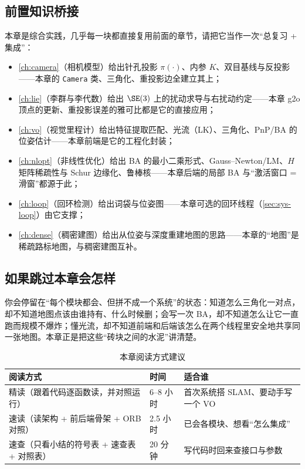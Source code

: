 \subsection*{前置知识桥接}
本章是综合实践，几乎每一块都直接复用前面的章节，请把它当作一次“总复习 + 集成”：
\begin{itemize}
  \item \cref{ch:camera}（相机模型）给出针孔投影 $\pi(\cdot)$、内参 $K$、双目基线与反投影——本章的 \texttt{Camera} 类、三角化、重投影边全建立其上；
  \item \cref{ch:lie}（李群与李代数）给出 $\SE(3)$ 上的扰动求导与右扰动约定——本章 g2o 顶点的更新、重投影误差的雅可比都是它的直接应用；
  \item \cref{ch:vo}（视觉里程计）给出特征提取匹配、光流（LK）、三角化、PnP/BA 的位姿估计——本章前端是它的工程化封装；
  \item \cref{ch:nlopt}（非线性优化）给出 BA 的最小二乘形式、Gauss--Newton/LM、$H$ 矩阵稀疏性与 Schur 边缘化、鲁棒核——本章后端的局部 BA 与“激活窗口 = 滑窗”都源于此；
  \item \cref{ch:loop}（回环检测）给出词袋与位姿图——本章可选的回环线程（\cref{sec:sys-loop}）由它支撑；
  \item \cref{ch:dense}（稠密建图）给出从位姿与深度重建地图的思路——本章的“地图”是稀疏路标地图，与稠密建图互补。
\end{itemize}

\subsection*{如果跳过本章会怎样}
你会停留在“每个模块都会、但拼不成一个系统”的状态：知道怎么三角化一对点，却不知道地图点该由谁持有、什么时候删；会写一次 BA，却不知道怎么让它一直跑而规模不爆炸；懂光流，却不知道前端和后端该怎么在两个线程里安全地共享同一张地图。本章正是把这些“砖块之间的水泥”讲清楚。

\begin{table}[H]\centering\small
\caption{本章阅读方式建议}
\begin{tabular}{lll}
\toprule
阅读方式 & 时间 & 适合谁 \\
\midrule
精读（跟着代码逐函数读，并对照运行） & 6--8 小时 & 首次系统搭 SLAM、要动手写一个 VO \\
速读（读架构 + 前后端骨架 + ORB 对照） & 2.5 小时 & 已会各模块、想看“怎么集成” \\
速查（只看小结的符号表 + 速查表 + 对照表） & 20 分钟 & 写代码时回来查接口与参数 \\
\bottomrule
\end{tabular}
\end{table}

